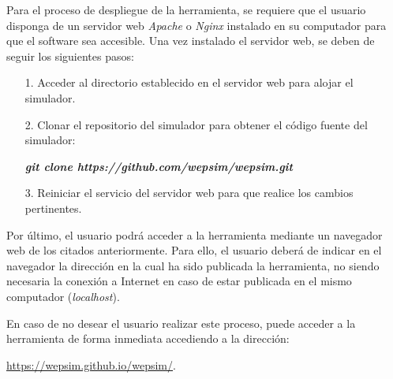 Para el proceso de despliegue de la herramienta, se requiere que el usuario disponga de un servidor web \textit{Apache}  o \textit{Nginx} instalado en su computador para que el software sea accesible. Una vez instalado el servidor web, se deben de seguir los siguientes pasos:

\begin{itemize}

	\item[1.] Acceder al directorio establecido en el servidor web para alojar el simulador.

	\item[2.] Clonar el repositorio del simulador para obtener el código fuente del simulador:
	
	 \textbf{\textit{git clone https://github.com/wepsim/wepsim.git}}
	
	\item[3.] Reiniciar el servicio del servidor web para que realice los cambios pertinentes.

\end{itemize}

Por último, el usuario podrá acceder a la herramienta mediante un navegador web de los citados anteriormente. Para ello, el usuario deberá de indicar en el navegador la dirección en la cual ha sido publicada la herramienta, no siendo necesaria la conexión a Internet en caso de estar publicada en el mismo computador (\textit{localhost}).

En caso de no desear el usuario realizar este proceso, puede acceder a la herramienta de forma inmediata accediendo a la dirección: 

\url{https://wepsim.github.io/wepsim/}.